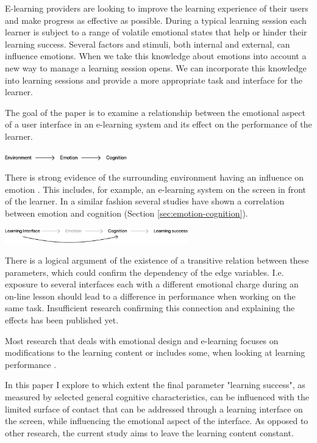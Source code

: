 E-learning providers are looking to improve the learning experience of their users and make progress as effective as possible. 
During a typical learning session each learner is subject to a range of volatile emotional states that help or hinder their learning success. 
Several factors and stimuli, both internal and external, can influence emotions. 
When we take this knowledge about emotions into account a new way to manage a learning session opens. We can incorporate this knowledge into learning sessions and provide a more appropriate task and interface for the learner.

The goal of the paper is to examine a relationship between the emotional aspect of a user interface in an e-learning system and its effect on the performance of the learner.


\begin{center}
	\includegraphics[width=200px]{graphics/relation1.png}
\end{center}
 
There is strong evidence of the surrounding environment having an influence on emotion \cite{Johnson2000, Arockiam2013, Bertamini2013}. This includes, for example, an e-learning system on the screen in front of the learner. In a similar fashion several studies have shown a correlation between emotion and cognition (Section \ref{sec:emotion-cognition}).

\begin{center}
\includegraphics[width=300px]{graphics/relation2.png}
\end{center}

There is a logical argument of the existence of a transitive relation between these parameters, which could confirm the dependency of the edge variables. 
I.e. exposure to several interfaces each with a different emotional charge during an on-line lesson should lead to a difference in performance when working on the same task.
Insufficient research confirming this connection and explaining the effects has been published yet. 

Most research that deals with emotional design and e-learning focuses on modifications to the learning content or includes some, when looking at learning performance \cite{Plass2014, Plass2016}.

In this paper I explore to which extent the final parameter "learning success", as measured by selected general cognitive characteristics, can be influenced with the limited surface of contact that can be addressed through a learning interface on the screen, while influencing the emotional aspect of the interface. As opposed to other research, the current study aims to leave the learning content constant.